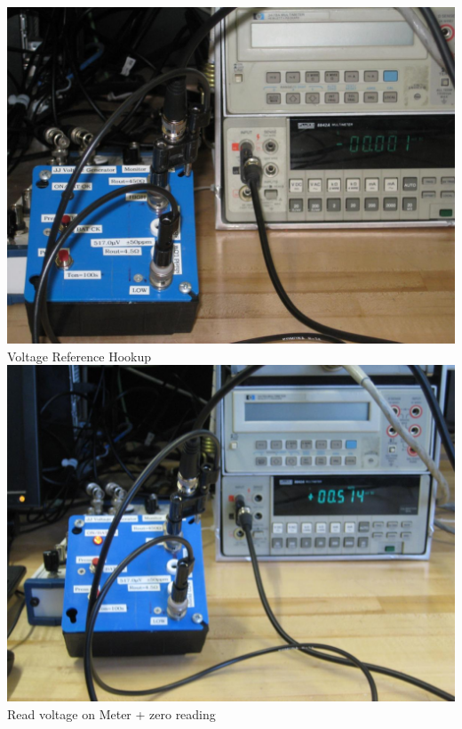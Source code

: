 \documentclass{../lab}
\begin{document}
\begin{minipage}[t]{0.5\linewidth}
    \centering
    \href{http://experimentationlab.berkeley.edu/sites/default/files/JOS/V-Ref-Hookup_4055.JPG}{\includegraphics[width=\linewidth,keepaspectratio]{images/V-Ref-Hookup_4055.JPG}} \\
    Voltage Reference Hookup \\\vspace{1em}
    \href{http://experimentationlab.berkeley.edu/sites/default/files/JOS/V-Ref_setup-517uV_4061.JPG}{\includegraphics[width=\linewidth,keepaspectratio]{images/V-Ref_setup-517uV_4061.JPG}} \\
    Read voltage on Meter + zero reading
\end{minipage}
\end{document}
